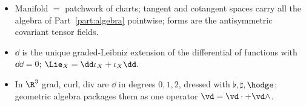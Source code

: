 \begin{keypoints}[Part II]
\begin{itemize}
\item Manifold $=$ patchwork of charts; tangent and cotangent spaces carry all the algebra of Part~\ref{part:algebra} pointwise; forms are the antisymmetric covariant tensor fields.
\item $\dd$ is the unique graded-Leibniz extension of the differential of functions with $\dd\dd=0$; $\Lie_X=\dd\iota_X+\iota_X\dd$.
\item In $\R^3$ grad, curl, div are $\dd$ in degrees $0,1,2$, dressed with $\flat,\sharp,\hodge$; geometric algebra packages them as one operator $\vd=\vd\cdot+\vd\wedge$.
\end{itemize}
\end{keypoints}
